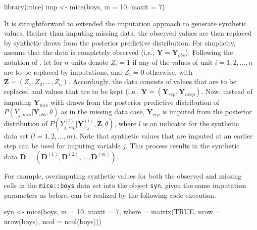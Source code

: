 \documentclass[psych,article,submit,moreauthors,pdftex]{mdpi}
\newenvironment{Shaded}{\begin{snugshade}}{\end{snugshade}}
\newcommand{\AttributeTok}[1]{\textcolor[rgb]{0.77,0.63,0.00}{#1}}
\newcommand{\ConstantTok}[1]{\textcolor[rgb]{0.00,0.00,0.00}{#1}}
\newcommand{\DecValTok}[1]{\textcolor[rgb]{0.00,0.00,0.81}{#1}}
\newcommand{\FunctionTok}[1]{\textcolor[rgb]{0.00,0.00,0.00}{#1}}
\newcommand{\NormalTok}[1]{#1}
\newcommand{\OtherTok}[1]{\textcolor[rgb]{0.56,0.35,0.01}{#1}}
\begin{document}
\begin{Shaded}
\begin{Highlighting}[]
\FunctionTok{library}\NormalTok{(mice)}
\NormalTok{imp }\OtherTok{\textless{}{-}} \FunctionTok{mice}\NormalTok{(boys, }
            \AttributeTok{m =} \DecValTok{10}\NormalTok{,}
            \AttributeTok{maxit =} \DecValTok{7}\NormalTok{)}
\end{Highlighting}
\end{Shaded}

It is straightforward to extended the imputation approach to generate
synthetic values. Rather than imputing missing data, the observed values
are then replaced by synthetic draws from the posterior predictive
distribution. For simplicity, assume that the data is completely
observed (i.e., \(\textbf{Y} = \textbf{Y}_{obs}\)). Following the
notation of \citet{reiter_raghunathan_multiple_2007}, let for \(n\)
units denote \(Z_i = 1\) if any of the values of unit
\(i = 1, 2, \dots, n\) are to be replaced by imputations, and
\(Z_i = 0\) otherwise, with \(\textbf{Z} = (Z_1, Z_2, \dots, Z_n)\).
Accordingly, the data consists of values that are to be replaced and
values that are to be kept (i.e.,
\(\textbf{Y} = (\textbf{Y}_{rep}, \textbf{Y}_{nrep})\). Now, instead of
imputing \(\textbf{Y}_{mis}\) with draws from the posterior predictive
distribution of \(P(Y_{j, mis} | \textbf{Y}_{obs}, \theta)\) as in the
missing data case, \(\textbf{Y}_{rep}\) is imputed from the posterior
distribution of
\(P(Y^{(l)}_{j, rep} | \textbf{Y}^{(l)}_{-j}, \textbf{Z}, \theta)\),
where \(l\) is an indicator for the synthetic data set
(\(l = 1, 2, \dots, m\)). Note that synthetic values that are imputed at
an earlier step can be used for imputing variable \(j\). This process
results in the synthetic data
\(\textbf{D} = (\textbf{D}^{(1)}, \textbf{D}^{(2)}, \dots, \textbf{D}^{(m)})\).

For example, overimputing synthetic values for both the observed and
missing cells in the \texttt{mice::boys} data set into the object
\texttt{syn}, given the same imputation parameters as before, can be
realized by the following code execution.

\begin{Shaded}
\begin{Highlighting}[]
\NormalTok{syn }\OtherTok{\textless{}{-}} \FunctionTok{mice}\NormalTok{(boys, }
            \AttributeTok{m =} \DecValTok{10}\NormalTok{,}
            \AttributeTok{maxit =} \DecValTok{7}\NormalTok{, }
            \AttributeTok{where =} \FunctionTok{matrix}\NormalTok{(}\ConstantTok{TRUE}\NormalTok{, }
                           \AttributeTok{nrow =} \FunctionTok{nrow}\NormalTok{(boys),}
                           \AttributeTok{ncol =} \FunctionTok{ncol}\NormalTok{(boys)))}
\end{Highlighting}
\end{Shaded}
\end{document}

